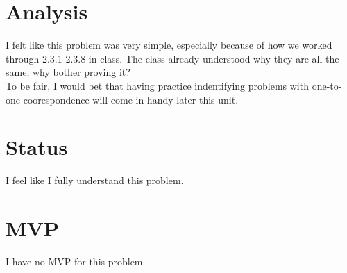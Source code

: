 \documentclass[11pt]{article} %
\newcommand\tab[1][1cm]{\hspace*{#1}}
\begin{document}
\section* {Analysis}
\tab I felt like this problem was very simple, especially because of how we worked through 2.3.1-2.3.8 in class. The class already understood why they are all the same, why bother proving it? 
\\ \tab To be fair, I would bet that having practice indentifying problems with one-to-one coorespondence will come in handy later this unit.

\section* {Status}
\tab I feel like I fully understand this problem.

\section* {MVP}
\tab I have no MVP for this problem.
\end{document}
